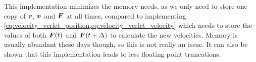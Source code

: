 This implementation minimizes the memory needs, as we only need to store one copy of $\boldsymbol{r}$, $\boldsymbol{v}$ and $\boldsymbol{F}$ at all times, compared to implementing \cref{eq:velocity_verlet_position,eq:velocity_verlet_velocity} which needs to store the values of both $\boldsymbol{F}(t)$ and $\boldsymbol{F}(t+\Delta)$ to calculate the new velocities. Memory is usually abundant these days though, so this is not really an issue. It can also be shown that this implementation leads to less floating point truncations\cite{frenkel2001understanding}.
